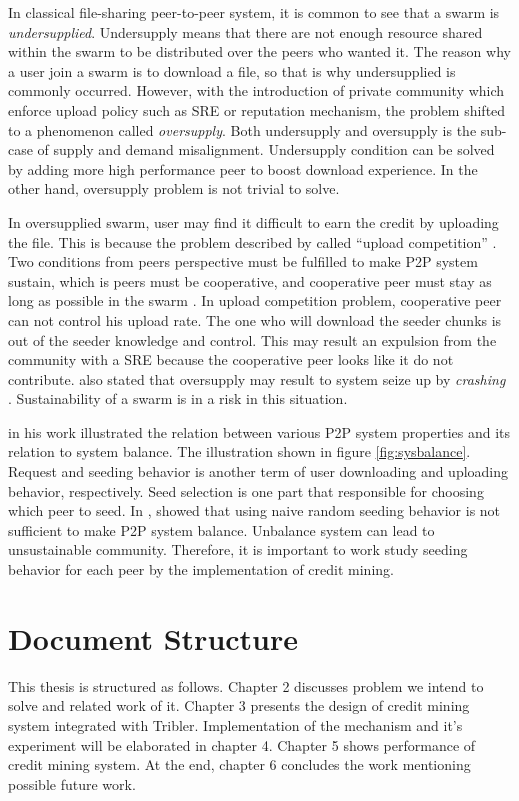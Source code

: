 In classical file-sharing peer-to-peer system, it is common to see that a swarm is \textit{undersupplied}. Undersupply means that there are not enough resource shared within the swarm to be distributed over the peers who wanted it. The reason why a user join a swarm is to download a file, so that is why undersupplied is commonly occurred. However, with the introduction of private community which enforce upload policy such as SRE or reputation mechanism, the problem shifted to a phenomenon called \textit{oversupply}. Both undersupply and oversupply is the sub-case of supply and demand misalignment. Undersupply condition can be solved by adding more high performance peer to boost download experience. In the other hand, oversupply problem is not trivial to solve.

In oversupplied swarm, user may find it difficult to earn the credit by uploading the file. This is because the problem described by \citeauthor{2011:managesupplydemand:meulpolder} called ``upload competition'' \cite{2011:managesupplydemand:meulpolder}. Two conditions from peers perspective must be fulfilled to make P2P system sustain, which is peers must be cooperative, and cooperative peer must stay as long as possible in the swarm \cite{2011:managesupplydemand:meulpolder}. In upload competition problem, cooperative peer can not control his upload rate. The one who will download the seeder chunks is out of the seeder knowledge and control. This may result an expulsion from the community with a SRE because the cooperative peer looks like it do not contribute. \citeauthor{2010:crashsustain:rahman} also stated that oversupply may result to system seize up by \textit{crashing}  \cite{2010:crashsustain:rahman}. Sustainability of a swarm is in a risk in this situation.

\citeauthor{2011:managesupplydemand:meulpolder} in his work illustrated the relation between various P2P system properties and its relation to system balance. The illustration shown in figure \ref{fig:sysbalance}. Request and seeding behavior is another term of user downloading and uploading behavior, respectively. Seed selection is one part that responsible for choosing which peer to seed. In \cite{2011:managesupplydemand:meulpolder}, \citeauthor{2011:managesupplydemand:meulpolder} showed that using naive random seeding behavior is not sufficient to make P2P system balance. Unbalance system can lead to unsustainable community. Therefore, it is important to work study seeding behavior for each peer by the implementation of credit mining.

\section{Document Structure}
This thesis is structured as follows. Chapter 2 discusses problem we intend to solve and related work of it. Chapter 3 presents the design of credit mining system integrated with Tribler. Implementation of the mechanism and it's experiment will be elaborated in chapter 4. Chapter 5 shows performance of credit mining system. At the end, chapter 6 concludes the work mentioning possible future work.


